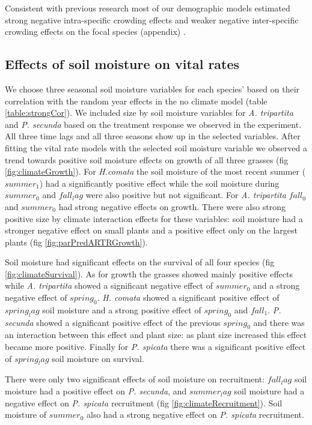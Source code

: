 \documentclass[11pt]{article}
\begin{document}
\begin{doublespacing}
Consistent with previous research most of our demographic models estimated strong negative intra-specific crowding effects and weaker negative inter-specific crowding effects on the focal species (appendix) \citep{adler_coexistence_2010,chu_direct_2016,chu_large_2015,adler_weak_2016}.

\subsection*{Effects of soil moisture on vital rates}

We choose three seasonal soil moisture variables for each species' based on their correlation with the random year effects in the no climate model (table \ref{table:strongCor}). We included size by soil moisture variables for \textit{A. tripartita} and  \textit{P. secunda} based on the treatment response we observed in the experiment. All three time lags and all three seasons show up in the selected variables. After fitting the vital rate models with the selected soil moisture variable we observed a trend towards positive soil moisture effects on growth of all three grasses (fig \ref{fig:climateGrowth}). For \textit{H.comata} the soil moisture of the most recent summer ($summer_1$) had a significantly positive effect while the soil moisture during $summer_0$ and $fall_lag$ were also positive but not significant. For \textit{A. tripartita} $fall_0$ and $summer_0$ had strong negative effects on growth. There were also strong positive size by climate interaction effects for these variables: soil moisture had a stronger negative effect on small plants and a positive effect only on the largest plants (fig \ref{fig:parPredARTRGrowth}).

Soil moisture had significant effects on the survival of all four species (fig  \ref{fig:climateSurvival}). As for growth the grasses showed mainly positive effects while \textit{A. tripartita} showed a significant negative effect of $summer_0$ and a strong negative effect of $spring_0$. \textit{H. comata} showed a significant positive effect of $spring_lag$ soil moisture and a strong positive effect of $spring_0$ and $fall_1$. \textit{P. secunda} showed a significant positive effect of the previous $spring_0$ and there was an interaction between this effect and plant size: as plant size increased this effect became more positive. Finally for \textit{P. spicata} there was a significant positive effect of $spring_lag$ soil moisture on survival.

There were only two significant effects of soil moisture on recruitment: $fall_lag$ soil moisture had a positive effect on \textit{P. secunda}, and $summer_lag$ soil moisture had a negative effect on \textit{P. spicata} recruitment (fig \ref{fig:climateRecruitment}). Soil moisture of $summer_0$ also had a strong negative effect on \textit{P. spicata} recruitment.  


\end{doublespacing}
\end{document}
